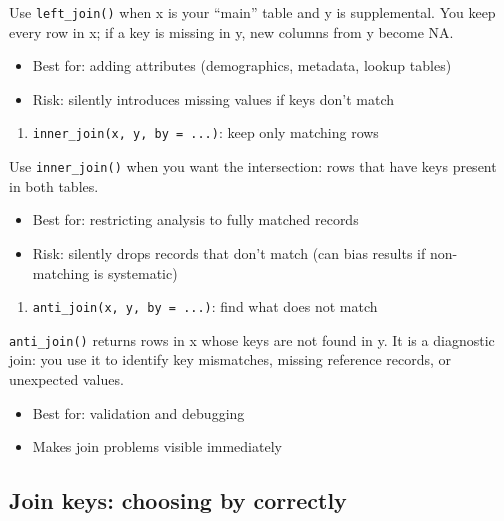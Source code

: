 \documentclass[
  11pt,
]{article}
\providecommand{\tightlist}{%
  \setlength{\itemsep}{0pt}\setlength{\parskip}{0pt}}
\begin{document}
Use \texttt{left\_join()} when x is your ``main'' table and y is
supplemental. You keep every row in x; if a key is missing in y, new
columns from y become NA.

\begin{itemize}
\tightlist
\item
  Best for: adding attributes (demographics, metadata, lookup tables)
\item
  Risk: silently introduces missing values if keys don't match
\end{itemize}

\begin{enumerate}
\def\labelenumi{\arabic{enumi}.}
\setcounter{enumi}{1}
\tightlist
\item
  \texttt{inner\_join(x,\ y,\ by\ =\ ...)}: keep only matching rows
\end{enumerate}

Use \texttt{inner\_join()} when you want the intersection: rows that
have keys present in both tables.

\begin{itemize}
\tightlist
\item
  Best for: restricting analysis to fully matched records
\item
  Risk: silently drops records that don't match (can bias results if
  non-matching is systematic)
\end{itemize}

\begin{enumerate}
\def\labelenumi{\arabic{enumi}.}
\setcounter{enumi}{2}
\tightlist
\item
  \texttt{anti\_join(x,\ y,\ by\ =\ ...)}: find what does not match
\end{enumerate}

\texttt{anti\_join()} returns rows in x whose keys are not found in y.
It is a diagnostic join: you use it to identify key mismatches, missing
reference records, or unexpected values.

\begin{itemize}
\tightlist
\item
  Best for: validation and debugging
\item
  Makes join problems visible immediately
\end{itemize}

\subsection{Join keys: choosing by
correctly}\label{join-keys-choosing-by-correctly}
\end{document}
